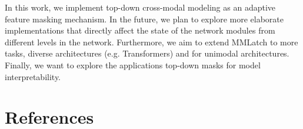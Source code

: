 \documentclass{article}
\begin{document}
In this work, we implement top-down cross-modal modeling as an adaptive feature masking mechanism. 
In the future, we plan to explore more elaborate implementations that directly affect the state of the network modules from different levels in the network.
Furthermore, we aim to extend MMLatch to more tasks, diverse architectures (e.g. Transformers) and for unimodal architectures.
Finally, we want to explore the applications top-down masks for model interpretability.









\section{References}
\small


\end{document}
